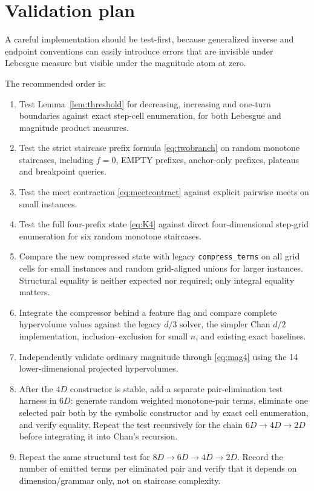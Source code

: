 \documentclass[12pt,a4paper]{article}
\theoremstyle{definition}
\newcommand{\1}{\mathbf 1}
\begin{document}
\section{Validation plan}

A careful implementation should be test-first, because generalized inverse and endpoint conventions can easily introduce errors that are invisible under Lebesgue measure but visible under the magnitude atom at zero.

The recommended order is:
\begin{enumerate}
\item Test Lemma~\ref{lem:threshold} for decreasing, increasing and one-turn boundaries against exact step-cell enumeration, for both Lebesgue and magnitude product measures.
\item Test the strict staircase prefix formula \eqref{eq:twobranch} on random monotone staircases, including $f=0$, EMPTY prefixes, anchor-only prefixes, plateaus and breakpoint queries.
\item Test the meet contraction \eqref{eq:meetcontract} against explicit pairwise meets on small instances.
\item Test the full four-prefix state \eqref{eq:K4} against direct four-dimensional step-grid enumeration for six random monotone staircases.
\item Compare the new compressed state with legacy \texttt{compress\_terms} on all grid cells for small instances and random grid-aligned unions for larger instances. Structural equality is neither expected nor required; only integral equality matters.
\item Integrate the compressor behind a feature flag and compare complete hypervolume values against the legacy $d/3$ solver, the simpler Chan $d/2$ implementation, inclusion--exclusion for small $n$, and existing exact baselines.
\item Independently validate ordinary magnitude through \eqref{eq:mag4} using the 14 lower-dimensional projected hypervolumes.
\item After the $4D$ constructor is stable, add a separate pair-elimination test harness in $6D$: generate random weighted monotone-pair terms, eliminate one selected pair both by the symbolic constructor and by exact cell enumeration, and verify equality.  Repeat the test recursively for the chain $6D\to4D\to2D$ before integrating it into Chan's recursion.
\item Repeat the same structural test for $8D\to6D\to4D\to2D$.  Record the number of emitted terms per eliminated pair and verify that it depends on dimension/grammar only, not on staircase complexity.
\end{enumerate}
\end{document}
